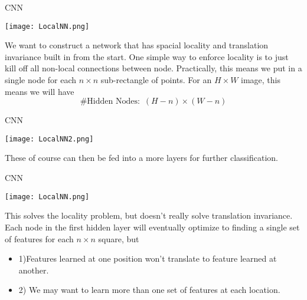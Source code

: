 \documentclass[10pt, table, dvipsnames,xcdraw, handout]{beamer}
\begin{document}
\begin{frame}[fragile]{CNN}
  \begin{minipage}[t][0.5\textheight][t]{\textwidth}\centering
\begin{center}
\texttt{[image: LocalNN.png]}
\end{center}
  \end{minipage}
  \vfill
\begin{minipage}[t][0.5\textheight][t]{\textwidth}
We want to construct a network that has spacial locality and translation invariance built in from the start. One simple way to enforce locality is to just kill off all non-local connections between node. Practically, this means we put in a single node for each $n\times n$ sub-rectangle of points. For an $H\times W$ image, this means we will have
$$
\text{\# Hidden Nodes:}\,\,\, (H-n)\times (W-n)
$$
\end{minipage}
\end{frame}



\begin{frame}[fragile]{CNN}
  \begin{minipage}[t][0.5\textheight][t]{\textwidth}\centering
\begin{center}
\texttt{[image: LocalNN2.png]}
\end{center}
  \end{minipage}
  \vfill
\begin{minipage}[t][0.5\textheight][t]{\textwidth}
These of course can then be fed into a more layers for further classification. 
\end{minipage}
\end{frame}




\begin{frame}[fragile]{CNN}
  \begin{minipage}[t][0.5\textheight][t]{\textwidth}\centering
\begin{center}
\texttt{[image: LocalNN.png]}
\end{center}
  \end{minipage}
  \vfill
\begin{minipage}[t][0.5\textheight][t]{\textwidth}
This solves the locality problem, but doesn't really solve translation invariance. Each node in the first hidden layer will eventually optimize to finding a single set of features for each $n\times n$ square, but 

\begin{itemize}
\item{1)}Features learned at one position won't translate to feature learned at another. 
\item{2)} We may want to learn more than one set of features at each location. 
\end{itemize}
\end{minipage}
\end{frame}
\end{document}
